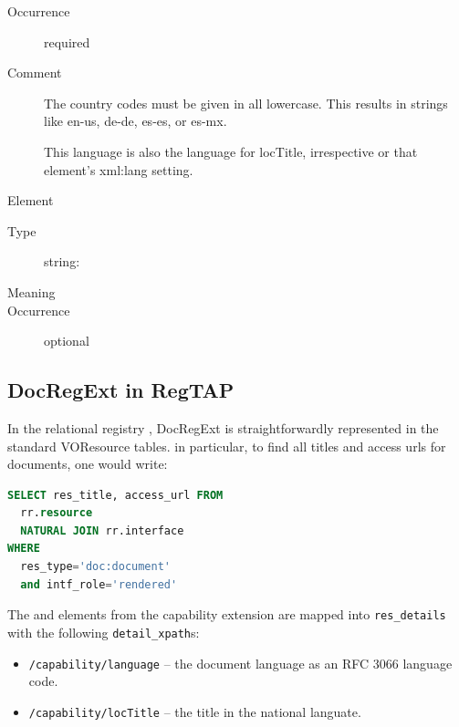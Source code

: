\documentclass{ivoa}
\begin{document}
\begin{generated}
\begin{bigdescription}
\begin{description}
\item[Occurrence] required
\item[Comment] 
                The country codes must be given in all lowercase.  This
                results in strings like en-us, de-de, es-es, or es-mx.

                This language is also the language for locTitle, 
                irrespective or that element's xml:lang setting.
              

\end{description}
\item[Element \xmlel{locTitle}]
\begin{description}
\item[Type] string: 
\item[Meaning] 
\item[Occurrence] optional

\end{description}


\end{bigdescription}\endgroup

\endgroup
\end{generated}


\subsection{DocRegExt in RegTAP}
\label{sect:docregext-regtap}

In the relational registry \citep{2014ivoa.spec.1208D}, DocRegExt is
straightforwardly represented in the standard VOResource tables.  in
particular, to find all titles and access urls for documents, one would
write:

\begin{lstlisting}[language=SQL]
SELECT res_title, access_url FROM
  rr.resource 
  NATURAL JOIN rr.interface
WHERE
  res_type='doc:document'
  and intf_role='rendered'
\end{lstlisting}

The  and  elements from the
 capability extension are mapped into
\verb|res_details| with the following \verb|detail_xpath|s:

\begin{itemize}

\item \texttt{/capability/language} -- the document language as an RFC
3066 language code.
\item \texttt{/capability/locTitle} -- the title in the national
languate.
\end{itemize}
\end{document}
